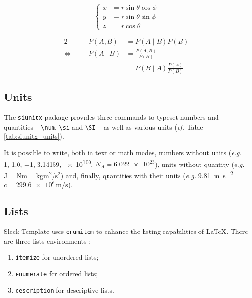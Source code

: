 \documentclass[12pt]{report}
\def\tbs{\textbackslash}
\begin{document}
    \begin{equation}
        \left\{
        \begin{aligned}
            x & = r \sin \theta \cos \phi \\
            y & = r \sin \theta \sin \phi \\
            z & = r \cos \theta
        \end{aligned}
        \right.
    \end{equation}

    \begin{alignat*}{2}
                              & & P(A, B)  & = P(A \mid B) P(B)                        \\
        \Leftrightarrow \quad & & P(A \mid B) & = \frac{P(A, B)}{P(B)}                 \\
                              & &          & = P(B \mid A) \frac{P(A)}{P(B)}
    \end{alignat*}

    \subsection{Units}

    The \texttt{siunitx} package provides three commands to typeset numbers and quantities -- \texttt{\tbs{}num}, \texttt{\tbs{}si} and \texttt{\tbs{}SI} -- as well as various units (\emph{cf.} Table \ref{tab:siunitx_units}).

    It is possible to write, both in text or math modes, numbers without units (\emph{e.g.} \num{1}, \num{1.0}, \num{-1}, \num{3.14159}, \num{e100}, $N_A = \num{6.022e23}$), units without quantity (\emph{e.g.} $\si{\joule} = \si{\newton\meter} = \si{\kilogram\meter\squared\per\second\squared}$) and, finally, quantities with their units (\emph{e.g.} \SI{9.81}{\meter\per\second\squared}, $c = \SI{299.6e6}{\meter\per\second}$).

    \subsection{Lists}

    Sleek Template uses \texttt{enumitem} to enhance the listing capabilities of \LaTeX{}. There are three lists environments :
    \begin{enumerate}
        \item \texttt{itemize} for unordered lists;
        \item \texttt{enumerate} for ordered lists;
        \item \texttt{description} for descriptive lists.
    \end{enumerate}
\end{document}
